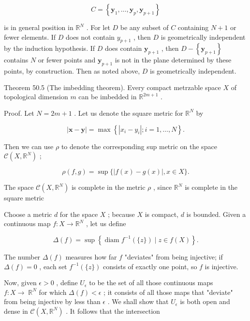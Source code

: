 \documentclass[10pt]{article}
\begin{document}
\[
C = \left\{  {{\mathbf{y}}_{1},\ldots ,{\mathbf{y}}_{p},{\mathbf{y}}_{p + 1}}\right\}
\]

is in general position in \({\mathbb{R}}^{N}\) . For let \(D\) be any subset of \(C\) containing \(N + 1\) or fewer elements. If \(D\) does not contain \({y}_{p + 1}\) , then \(D\) is geometrically independent by the induction hypothesis. If \(D\) does contain \({\mathbf{y}}_{p + 1}\) , then \(D - \left\{  {\mathbf{y}}_{p + 1}\right\}\) contains \(N\) or fewer points and \({\mathbf{y}}_{p + 1}\) is not in the plane determined by these points, by construction. Then as noted above, \(D\) is geometrically independent.

Theorem 50.5 (The imbedding theorem). Every compact metrzable space \(X\) of topological dimension \(m\) can be imbedded in \({\mathbb{R}}^{{2m} + 1}\) .

Proof. Let \(N = {2m} + 1\) . Let us denote the square metric for \({\mathbb{R}}^{N}\) by

\[
\left| {\mathbf{x} - \mathbf{y}}\right|  = \max \left\{  {\left| {{x}_{i} - {y}_{i}}\right| ;i = 1,\ldots ,N}\right\}  .
\]

Then we can use \(\rho\) to denote the corresponding sup metric on the space \(\mathcal{C}\left( {X,{\mathbb{R}}^{N}}\right)\) ;

\[
\rho \left( {f,g}\right)  = \sup \{ \left| {f\left( x\right)  - g\left( x\right) }\right| ,x \in  X\} .
\]

The space \(\mathcal{C}\left( {X,{\mathbb{R}}^{N}}\right)\) is complete in the metric \(\rho\) , since \({\mathbb{R}}^{N}\) is complete in the square metric

Choose a metric \(d\) for the space \(X\) ; because \(X\) is compact, \(d\) is bounded. Given a continuous map \(f : X \rightarrow  {\mathbb{R}}^{N}\) , let us define

\[
\Delta \left( f\right)  = \sup \left\{  {\operatorname{diam}{f}^{-1}\left( {\{ z\} }\right)  \mid  z \in  f\left( X\right) }\right\}  .
\]

The number \(\Delta \left( f\right)\) measures how far \(f\) "deviates" from being injective; if \(\Delta \left( f\right)  = 0\) , each set \({f}^{-1}\left( {\{ z\} }\right)\) consists of exactly one point, so \(f\) is injective.

Now, given \(\epsilon  > 0\) , define \({U}_{\epsilon }\) to be the set of all those continuous maps \(f : X \rightarrow \; {\mathbb{R}}^{N}\) for which \(\Delta \left( f\right)  < \epsilon\) ; it consists of all those maps that "deviate" from being injective by less than \(\epsilon\) . We shall show that \({U}_{\epsilon }\) is both open and dense in \(\mathcal{C}\left( {X,{\mathbb{R}}^{N}}\right)\) . It follows that the intersection
\end{document}
